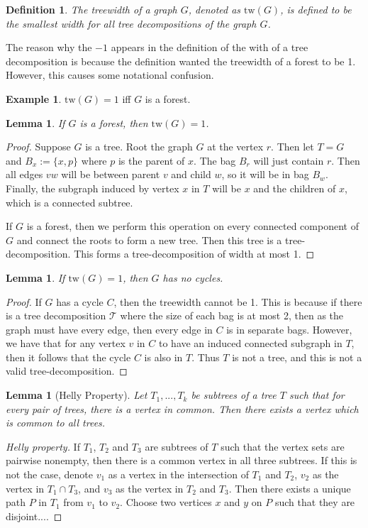 \documentclass[]{article}
\newcommand{\tree}{\mathcal{T}}
\newcommand{\tw}{\text{tw}}
\newtheorem{lemma}[theorem]{Lemma}
\newtheorem{definition}[theorem]{Definition}
\theoremstyle{definition}
\newtheorem{example}[theorem]{Example}
\numberwithin{theorem}{section}
\numberwithin{equation}{section}
\begin{document}
\begin{definition}
	The treewidth of a graph $G$, denoted as $\tw(G)$, is defined to be the smallest width for all tree decompositions of the graph $G$.
\end{definition}
The reason why the $-1$ appears in the definition of the with of a tree decomposition is because the definition wanted the treewidth of a forest to be 1. However, this causes some notational confusion.
\begin{example}
	$\tw(G) = 1$ iff $G$ is a forest.
	\begin{lemma}
		If $G$ is a forest, then $\tw(G) = 1$.
	\end{lemma}
	\begin{proof}
		Suppose $G$ is a tree. Root the graph $G$ at the vertex $r$. Then let $T = G$ and $B_x:= \lbrace x, p \rbrace$ where $p$ is the parent of $x$. The bag $B_r$ will just contain $r$. Then all edges $vw$ will be between parent $v$ and child $w$, so it will be in bag $B_w$. Finally, the subgraph induced by vertex $x$ in $T$ will be $x$ and the children of $x$, which is a connected subtree.
		
		If $G$ is a forest, then we perform this operation on every connected component of $G$ and connect the roots to form a new tree. Then this tree is a tree-decomposition. This forms a tree-decomposition of width at most 1. 
	\end{proof}
	\begin{lemma}
		If $\tw(G) = 1$, then $G$ has no cycles.
	\end{lemma}
	\begin{proof}
		If $G$ has a cycle $C$, then the treewidth cannot be 1. This is because if there is a tree decomposition $\tree$ where the size of each bag is at most 2, then as the graph must have every edge, then every edge in $C$ is in separate bags. However, we have that for any vertex $v$ in $C$ to have an induced connected subgraph in $T$, then it follows that the cycle $C$ is also in $T$. Thus $T$ is not a tree, and this is not a valid tree-decomposition. 
	\end{proof}
\end{example}
\begin{lemma}[Helly Property]
	Let $T_1, ..., T_k$ be subtrees of a tree $T$ such that for every pair of trees, there is a vertex in common. Then there exists a vertex which is common to all trees.
\end{lemma}
\begin{proof}[Helly property]
	If $T_1$, $T_2$ and $T_3$ are subtrees of $T$ such that the vertex sets are pairwise nonempty, then there is a common vertex in all three subtrees. If this is not the case, denote $v_1$ as a vertex in the intersection of $T_1$ and $T_2$, $v_2$ as the vertex in $T_1 \cap T_3$, and $v_3$ as the vertex in $T_2$ and $T_3$. Then there exists a unique path $P$ in $T_1$ from $v_1$ to $v_2$. Choose two vertices $x$ and $y$ on $P$ such that they are disjoint....
\end{proof}
\end{document}
